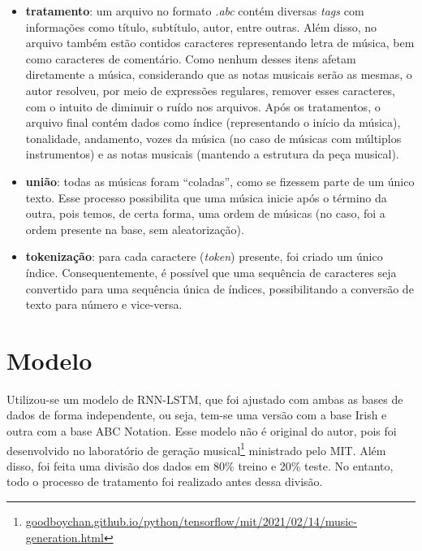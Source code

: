\documentclass[twoside]{automatextcc}
\begin{document}
\begin{itemize}
    \item \textbf{tratamento}: um arquivo no formato \textit{.abc} contém diversas \textit{tags} com informações como título, subtítulo, autor, entre outras. Além disso, no arquivo também estão contidos caracteres representando letra de música, bem como caracteres de comentário. Como nenhum desses itens afetam diretamente a música, considerando que as notas musicais serão as mesmas, o autor resolveu, por meio de expressões regulares, remover esses caracteres, com o intuito de diminuir o ruído nos arquivos. Após os tratamentos, o arquivo final contém dados como índice (representando o início da música), tonalidade, andamento, vozes da música (no caso de músicas com múltiplos instrumentos) e as notas musicais (mantendo a estrutura da peça musical).
    \item \textbf{união}: todas as músicas foram ``coladas'', como se fizessem parte de um único texto. Esse processo possibilita que uma música inicie após o término da outra, pois temos, de certa forma, uma ordem de músicas (no caso, foi a ordem presente na base, sem aleatorização).
    \item \textbf{tokenização}: para cada caractere (\textit{token}) presente, foi criado um único índice. Consequentemente, é possível que uma sequência de caracteres seja convertido para uma sequência única de índices, possibilitando a conversão de texto para número e vice-versa.
\end{itemize}




\section{Modelo}
Utilizou-se um modelo de RNN-LSTM, que foi ajustado com ambas as bases de dados de forma independente, ou seja, tem-se uma versão com a base Irish e outra com a base ABC Notation. Esse modelo não é original do autor, pois foi desenvolvido no laboratório de geração musical\footnote{\href{https://goodboychan.github.io/python/tensorflow/mit/2021/02/14/music-generation.html}{\url{goodboychan.github.io/python/tensorflow/mit/2021/02/14/music-generation.html}}}  ministrado pelo MIT. Além disso, foi feita uma divisão dos dados em 80\% treino e 20\% teste. No entanto, todo o processo de tratamento foi realizado antes dessa divisão.



\end{document}
